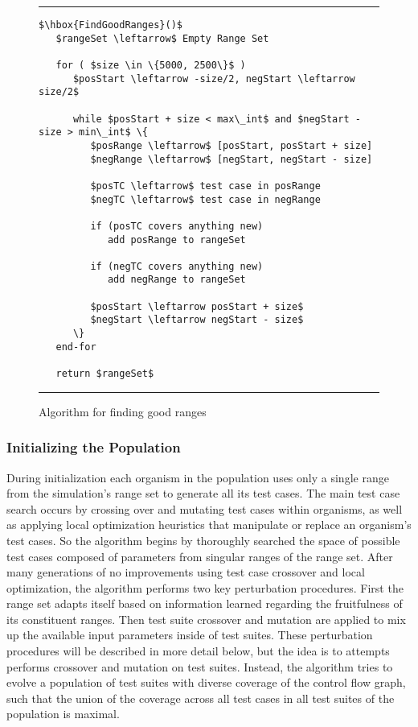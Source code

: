 \documentclass[runningheads]{llncs}
\begin{document}
\begin{figure}[h!]
\begin{center}
\hrule
\medskip
\begin{Verbatim}[fontfamily=tt, xleftmargin=10pt, commandchars=\\\{\},
codes={\catcode`$=3\catcode`^=7\catcode`_=8}]
$\hbox{FindGoodRanges}()$  
   $rangeSet \leftarrow$ Empty Range Set
		
   for ( $size \in \{5000, 2500\}$ ) 
      $posStart \leftarrow -size/2, negStart \leftarrow size/2$
		
      while $posStart + size < max\_int$ and $negStart - size > min\_int$ \{
         $posRange \leftarrow$ [posStart, posStart + size]
         $negRange \leftarrow$ [negStart, negStart - size]
		
         $posTC \leftarrow$ test case in posRange
         $negTC \leftarrow$ test case in negRange
		
         if (posTC covers anything new)
            add posRange to rangeSet
		
         if (negTC covers anything new)
            add negRange to rangeSet
		
         $posStart \leftarrow posStart + size$
         $negStart \leftarrow negStart - size$
      \}
   end-for
		
   return $rangeSet$
\end{Verbatim}
\hrule
\end{center}
\caption{Algorithm for finding good ranges \label{fig:ranges}}
\end{figure}
\FloatBarrier

\subsubsection{Initializing the Population}

During initialization each organism in the population uses only a single range from the simulation's range set to generate all its test cases. The main test case search occurs by crossing over and mutating test cases within organisms, as well as applying local optimization heuristics that manipulate or replace an organism's test cases. So the algorithm begins by thoroughly searched the space of possible test cases composed of parameters from singular ranges of the range set. After many generations of no improvements using test case crossover and local optimization, the algorithm  performs two key perturbation procedures. First the range set adapts itself based on information learned regarding the fruitfulness of its constituent ranges. Then test suite crossover and mutation are applied to mix up the available input parameters inside of test suites. These perturbation procedures will be described in more detail below, but the idea is to  attempts performs crossover and mutation on test suites. Instead, the algorithm tries to evolve a population of test suites with diverse coverage of the control flow graph, such that the union of the coverage across all test cases in all test suites of the population is maximal. 
\end{document}
